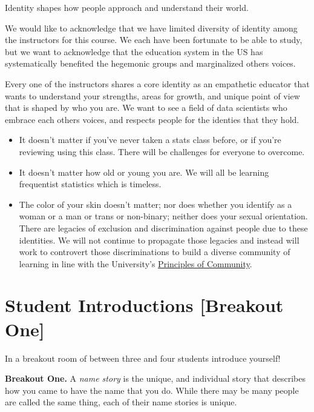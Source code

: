 \documentclass[
]{book}
\providecommand{\tightlist}{%
  \setlength{\itemsep}{0pt}\setlength{\parskip}{0pt}}
\theoremstyle{definition}
\theoremstyle{definition}
\theoremstyle{definition}
\theoremstyle{definition}
\theoremstyle{remark}
\begin{document}
Identity shapes how people approach and understand their world.

We would like to acknowledge that we have limited diversity of identity among the instructors for this course. We each have been fortunate to be able to study, but we want to acknowledge that the education system in the US has systematically benefited the hegemonic groups and marginalized others voices.

Every one of the instructors shares a core identity as an empathetic educator that wants to understand your strengths, areas for growth, and unique point of view that is shaped by who you are. We want to see a field of data scientists who embrace each others voices, and respects people for the identies that they hold.

\begin{itemize}
\tightlist
\item
  It doesn't matter if you've never taken a stats class before, or if you're reviewing using this class. There will be challenges for everyone to overcome.
\item
  It doesn't matter how old or young you are. We will all be learning frequentist statistics which is timeless.
\item
  The color of your skin doesn't matter; nor does whether you identify as a woman or a man or trans or non-binary; neither does your sexual orientation. There are legacies of exclusion and discrimination against people due to these identities. We will not continue to propagate those legacies and instead will work to controvert those discriminations to build a diverse community of learning in line with the University's \href{https://diversity.berkeley.edu/principles-community}{Principles of Community}.
\end{itemize}

\hypertarget{student-introductions-breakout-one}{%
\section{Student Introductions {[}Breakout One{]}}\label{student-introductions-breakout-one}}

In a breakout room of between three and four students introduce yourself!

\textbf{Breakout One.} A \emph{name story} is the unique, and individual story that describes how you came to have the name that you do. While there may be many people are called the same thing, each of their name stories is unique.
\end{document}
